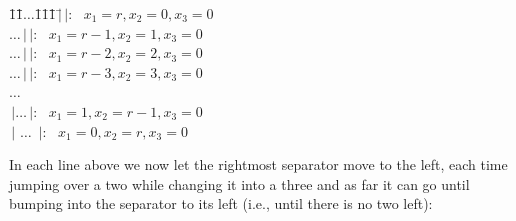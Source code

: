 \documentclass[titlepage]{article}
\theoremstyle{definition}
\numberwithin{equation}{subsection}
\numberwithin{remark}{subsection}
\begin{document}
{\small{\begin{tabbing}
\hspace*{50pt}\=1\=1\=$\ldots$\=1\=1\=1\=$\,|$\=$\,|$: $\,\,\,x_1=r, x_2=0, x_3=0$\\
\>$\ldots$\>$\,|$\>$\,|$: $\,\,\,x_1=r-1, x_2=1, x_3=0$\\
\>$\ldots$\>$\,|$\>$\,|$: $\,\,\,x_1=r-2, x_2=2, x_3=0$\\
\>$\ldots$\>$\,|$\>$\,|$: $\,\,\,x_1=r-3, x_2=3, x_3=0$\\
\>\>\>$\ldots$\\
\>$\,|$\>$\ldots$\>$\,|$: $\,\,\,x_1=1, x_2=r-1, x_3=0$\\
\>$\,|$    \>$\ldots$        \>$\,|$: $\,\,\,x_1=0, x_2=r, x_3=0$
\end{tabbing}}}
\par\noindent
In each line above we now let the rightmost separator move to the left, each time jumping over a two while changing it into a three and as far it can go until bumping into the separator to its left (i.e., until there is no two left):
\end{document}
